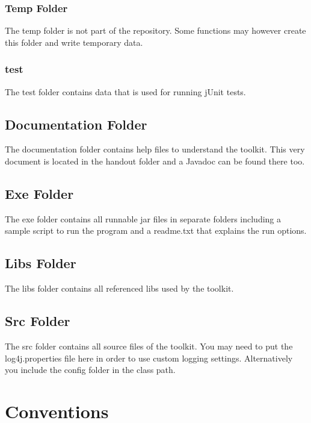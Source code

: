 \documentclass[a4paper,twoside]{book}      %
\begin{document}
\subsection{Temp Folder}
The temp folder is not part of the repository. Some functions may however create this folder and write temporary data.

\subsection{test}  
The test folder contains data that is used for running jUnit tests.

\section{Documentation Folder}
The documentation folder contains help files to understand the toolkit. This very document is located in the handout folder and a Javadoc can be found there too.

\section{Exe Folder}
The exe folder contains all runnable jar files in separate folders including a sample script to run the program and a readme.txt that explains the run options.

\section{Libs Folder}
The libs folder contains all referenced libs used by the toolkit.

\section{Src Folder}
The src folder contains all source files of the toolkit. You may need to put the log4j.properties file here in order to use custom logging settings. Alternatively you include the config folder in the class path.


\chapter{Conventions}
\end{document}
